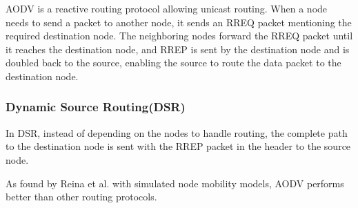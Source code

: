 AODV is a reactive routing protocol allowing unicast routing. When a node needs
to send a packet to another node, it sends an RREQ packet mentioning the
required destination node\cite{reina2011}. The neighboring nodes forward the
RREQ packet until it reaches the destination node, and RREP is sent by the
destination node and is doubled back to the source, enabling the source to
route the data packet to the destination node\cite{reina2011}.

\subsubsection{Dynamic Source Routing(DSR)}

In DSR, instead of depending on the nodes to handle routing, the complete path
to the destination node is sent with the RREP packet in the header to the
source node\cite{chlamtac2003}.

As found by Reina et al. with simulated node mobility models, AODV performs
better than other routing protocols\cite{reina2011}.
